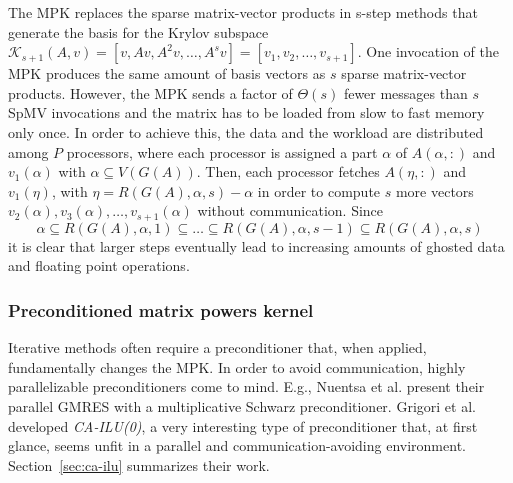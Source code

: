 \documentclass{scrartcl}
\begin{document}
The MPK replaces the sparse matrix-vector products in s-step methods that generate the basis for the Krylov subspace $\mathcal{K}_{s + 1}(A, v) = \left[v, Av, A^2v, \ldots, A^{s}v\right] = \left[v_1, v_2, \ldots, v_{s + 1}\right]$. One invocation of the MPK produces the same amount of basis vectors as $s$ sparse matrix-vector products. However, the MPK sends a factor of $\Theta(s)$ fewer messages than $s$ SpMV invocations and the matrix has to be loaded from slow to fast memory only once.
In order to achieve this, the data and the workload are distributed among $P$ processors, where each processor is assigned a part $\alpha$ of $A(\alpha,:)$ and $v_1(\alpha)$ with $\alpha \subseteq V(G(A))$. Then, each processor fetches $A(\eta,:)$ and $v_1(\eta)$, with $\eta = R(G(A), \alpha, s) - \alpha$ in order to compute $s$ more vectors $v_2(\alpha), v_3(\alpha), \ldots, v_{s + 1}(\alpha)$ without communication. Since
\begin{equation*}
\alpha \subseteq R(G(A),\alpha, 1) \subseteq \ldots \subseteq R(G(A),\alpha, s - 1) \subseteq R(G(A),\alpha, s)
\end{equation*} it is clear that larger steps eventually lead to increasing amounts of ghosted data and floating point operations.

\subsubsection{Preconditioned matrix powers kernel}
Iterative methods often require a preconditioner that, when applied, fundamentally changes the MPK. In order to avoid communication, highly parallelizable preconditioners come to mind. E.g., Nuentsa et al. \cite{nuen11c} present their parallel GMRES with a multiplicative Schwarz preconditioner. Grigori et al. \cite{Grigori} developed \textit{CA-ILU(0)}, a very interesting type of preconditioner that, at first glance, seems unfit in a parallel and communication-avoiding environment. Section~\ref{sec:ca-ilu} summarizes their work.
\end{document}
